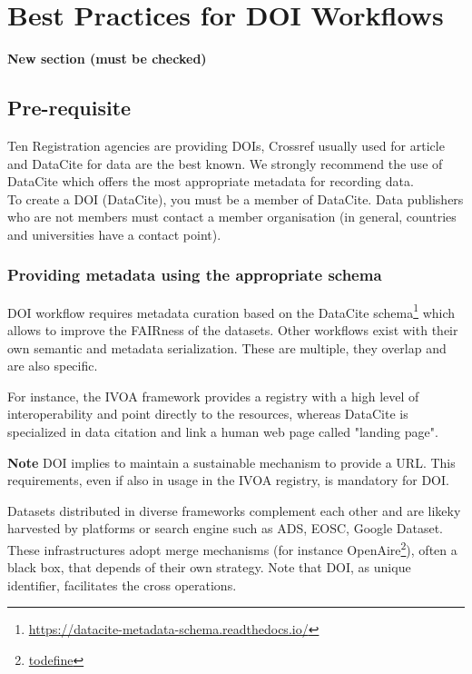 \documentclass[11pt,a4paper]{ivoa}
\newcommand{\important}[1]{
	\begin{bigdescription}
		\item \color{ivoacolor}\textbf{Note} #1
	\end{bigdescription}
}
\begin{document}
\section{Best Practices for DOI Workﬂows}
\textbf{\color{red}New section (must be checked)}

\subsection{Pre-requisite}
Ten Registration agencies are providing DOIs, Crossref usually used for article and DataCite for data are the best known. 
We strongly recommend the use of DataCite which offers the most appropriate metadata for recording data.\\

To create a DOI (DataCite), you must be a member of DataCite. Data publishers who are not members must contact a member organisation (in general, countries and universities have a contact point).


\subsubsection{Providing metadata using the appropriate schema}
\label{sec:bestpractice:providing}
DOI workflow requires metadata curation based on the DataCite schema\footnote{\url{https://datacite-metadata-schema.readthedocs.io/}} which allows to improve the FAIRness of the datasets. Other workflows exist with their own semantic and metadata serialization. These are multiple, they overlap and are also specific.

For instance, the IVOA framework provides a registry with a high level  of interoperability and point directly to the resources, whereas DataCite is specialized in data citation and link a human web page called "landing page".

\important{
DOI implies to maintain a sustainable mechanism to provide a URL. 
This requirements, even if also in usage in the IVOA registry, is mandatory for DOI.
}

Datasets distributed in diverse frameworks complement each other and are likeky harvested by platforms or search engine such as ADS, EOSC, Google Dataset. These infrastructures adopt merge mechanisms (for instance OpenAire\footnote{\url{todefine}}), often a black box, that depends of their own strategy. Note that DOI, as unique identifier, facilitates the cross operations.
\end{document}
